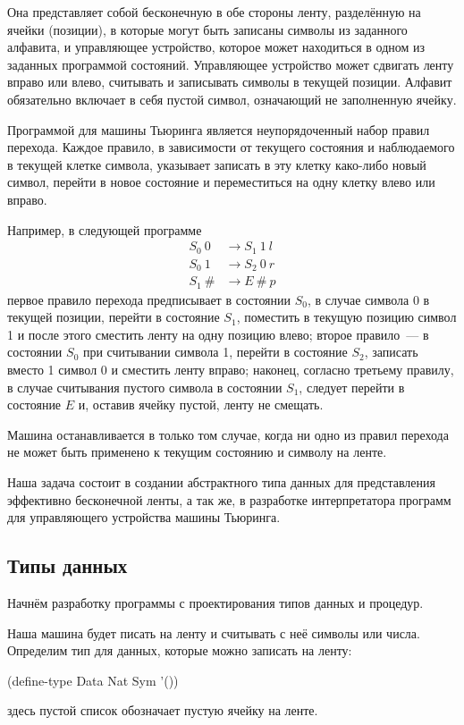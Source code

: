 Она представляет собой бесконечную в обе стороны ленту, разделённую на ячейки (позиции), в которые могут быть записаны символы из заданного алфавита, и управляющее устройство, которое может находиться в одном из заданных программой состояний. Управляющее устройство может сдвигать ленту вправо или влево, считывать и записывать символы в текущей позиции. Алфавит обязательно включает в себя пустой символ, означающий не заполненную ячейку.

Программой для машины Тьюринга является неупорядоченный набор правил перехода. Каждое правило, в зависимости от текущего состояния и наблюдаемого в текущей клетке символа, указывает записать в эту клетку како-либо новый символ, перейти в новое состояние и переместиться на одну клетку влево или вправо. 

Например, в следующей программе
\label{TM-prog}
\begin{align*}
S_0~0 &\to S_1~1~l\\
S_0~1 &\to S_2~0~r\\
S_1~\# &\to E~\#~p
\end{align*}
первое правило перехода предписывает в состоянии $S_0$, в случае символа 0 в текущей позиции, перейти в состояние $S_1$, поместить в текущую позицию символ 1 и после этого сместить ленту на одну позицию влево; второе правило~--- в состоянии $S_0$ при считывании символа 1, перейти в состояние $S_2$, записать вместо 1 символ 0 и сместить ленту вправо; наконец, согласно третьему правилу, в случае считывания пустого символа в состоянии $S_1$, следует перейти в состояние $E$ и, оставив ячейку пустой, ленту не смещать.

Машина останавливается в только том случае, когда ни одно из правил перехода не может быть применено к текущим состоянию и символу на ленте.

Наша задача состоит в создании абстрактного типа данных для представления эффективно бесконечной ленты, а так же, в разработке интерпретатора программ для управляющего устройства машины Тьюринга.


\subsection*{Типы данных}

Начнём разработку программы с проектирования типов данных и процедур.

Наша машина будет писать на ленту и считывать с неё символы или числа. Определим тип для данных, которые можно записать на ленту:
\begin{SchemeCode}
(define-type Data  Nat Sym '())
\end{SchemeCode}
\noindent здесь пустой список обозначает пустую ячейку на ленте.

